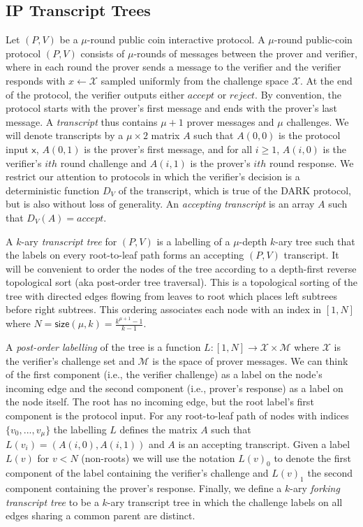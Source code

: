 \subsection{IP Transcript Trees}\label{sec:IPtrees}

Let $(P,V)$ be a $\mu$-round public coin interactive protocol. A $\mu$-round public-coin protocol $(P,V)$ consists of $\mu$-rounds of messages between the prover and verifier, where in each round the prover sends a message to the verifier and the verifier responds with $x \leftarrow \mathcal{X}$ sampled uniformly from the challenge space $\mathcal{X}$. At the end of the protocol, the verifier outputs either $accept$ or $reject$. By convention, the protocol starts with the prover's first message and ends with the prover's last message. A \emph{transcript} thus contains $\mu+1$ prover messages and $\mu$ challenges. We will denote transcripts by a $\mu \times 2$ matrix $A$ such that $A(0,0)$ is the protocol input $\mathsf{x}$, $A(0, 1)$ is the prover's first message, and for all $i ≥ 1$, $A(i, 0)$ is the verifier's $ith$ round challenge and $A(i,1)$ is the prover's $ith$ round response.  We restrict our attention to protocols in which the verifier's decision is a deterministic function $D_V$ of the transcript, which is true of the DARK protocol, but is also without loss of generality. An \emph{accepting transcript} is an array $A$ such that $D_V(A) = accept$. 

A $k$-ary \emph{transcript tree} for $(P,V)$ is a labelling of a $\mu$-depth $k$-ary tree such that the labels on every root-to-leaf path forms an accepting $(P,V)$ transcript.  It will be convenient to order the nodes of the tree according to a depth-first reverse topological sort (aka post-order tree traversal). This is a topological sorting of the tree with directed edges flowing from leaves to root which places left subtrees before right subtrees. This ordering associates each node with an index in $[1,N]$ where $N = \textsf{size}(\mu, k) = \frac{k^{\mu+1} - 1}{k-1}$. 

A \emph{post-order labelling} of the tree is a function $L:[1,N] \rightarrow \mathcal{X} \times \mathcal{M}$ where $\mathcal{X}$ is the verifier's challenge set and $\mathcal{M}$ is the space of prover messages. We can think of the first component (i.e., the verifier challenge) as a label on the node's incoming edge and the second component (i.e., prover's response) as a label on the node itself. The root has no incoming edge, but the root label's first component is the protocol input. For any root-to-leaf path of nodes with indices $\{v_0,...,v_\mu\}$ the labelling $L$ defines the matrix $A$ such that $L(v_i) = (A(i, 0), A(i, 1))$ and $A$ is an accepting transcript. Given a label $L(v)$ for $v < N$ (non-roots) we will use the notation $L(v)_0$ to denote the first component of the label containing the verifier's challenge and $L(v)_1$ the second component containing the prover's response. Finally, we define a $k$-ary \emph{forking transcript tree} to be a $k$-ary transcript tree in which the challenge labels on all edges sharing a common parent are distinct.

